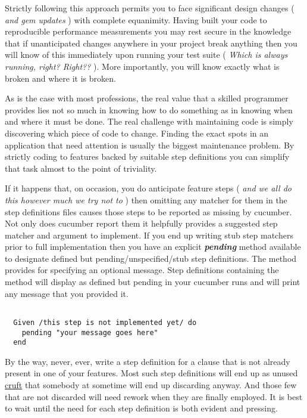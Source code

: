 \documentclass[10pt]{book}
\begin{document}
Strictly following this approach permits you to face significant design changes ( \emph{and gem updates} ) with complete equanimity. Having built your code to reproducible performance measurements you may rest secure in the knowledge that if unanticipated changes anywhere in your project break anything then you will know of this immediately upon running your test suite ( \emph{Which is always running, right? Right??} ).  More importantly, you will know exactly what is broken and where it is broken.

As is the case with most professions, the real value that a skilled programmer provides lies not so much in knowing how to do something as in knowing when and where it must be done.  The real challenge with maintaining code is simply discovering which piece of code to change.  Finding the exact spots in an application that need attention is usually the biggest maintenance problem.  By strictly coding to features backed by suitable step definitions you can simplify that task almost to the point of triviality.

If it happens that, on occasion, you do anticipate feature steps ( \emph{and we all do this however much we try not to} ) then omitting any matcher for them in the step definitions files causes those steps to be reported as missing by cucumber. Not only does cucumber report them it helpfully provides a suggested step matcher and argument to implement.  If you end up writing stub step matchers prior to full implementation then you have an explicit \textbf{\emph{pending}} method available to designate defined but pending/unspecified/stub step definitions.  The \verb@pending@ method provides for specifying an optional message.  Step definitions containing the \verb@pending@ method will display as defined but pending in your cucumber runs and will print any message that you provided it.
\begin{verbatim}

  Given /this step is not implemented yet/ do
    pending "your message goes here"
  end

\end{verbatim}

By the way, never, ever, write a step definition for a clause that is not already present in one of your features.  Most such step definitions will end up as unused \href{http://en.wikipedia.org/wiki/Cruft}{cruft} that somebody at sometime will end up discarding anyway.   And those few that are not discarded will need rework when they are finally employed.  It is best to wait until the need for each step definition is both evident and pressing.
\end{document}
